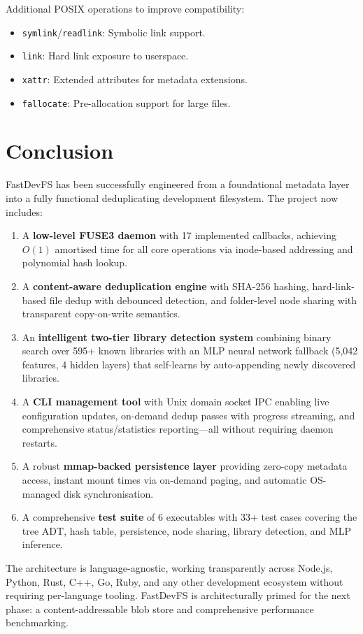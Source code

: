 \documentclass[12pt, a4paper]{article}
\begin{document}
Additional POSIX operations to improve compatibility:
\begin{itemize}
  \item \texttt{symlink}/\texttt{readlink}: Symbolic link support.
  \item \texttt{link}: Hard link exposure to userspace.
  \item \texttt{xattr}: Extended attributes for metadata extensions.
  \item \texttt{fallocate}: Pre-allocation support for large files.
\end{itemize}

\section{Conclusion}

FastDevFS has been successfully engineered from a foundational metadata layer into a fully functional deduplicating development filesystem. The project now includes:

\begin{enumerate}
  \item A \textbf{low-level FUSE3 daemon} with 17 implemented callbacks, achieving $O(1)$ amortised time for all core operations via inode-based addressing and polynomial hash lookup.

  \item A \textbf{content-aware deduplication engine} with SHA-256 hashing, hard-link-based file dedup with debounced detection, and folder-level node sharing with transparent copy-on-write semantics.

  \item An \textbf{intelligent two-tier library detection system} combining binary search over 595+ known libraries with an MLP neural network fallback (5,042 features, 4 hidden layers) that self-learns by auto-appending newly discovered libraries.

  \item A \textbf{CLI management tool} with Unix domain socket IPC enabling live configuration updates, on-demand dedup passes with progress streaming, and comprehensive status/statistics reporting---all without requiring daemon restarts.

  \item A robust \textbf{mmap-backed persistence layer} providing zero-copy metadata access, instant mount times via on-demand paging, and automatic OS-managed disk synchronisation.

  \item A comprehensive \textbf{test suite} of 6 executables with 33+ test cases covering the tree ADT, hash table, persistence, node sharing, library detection, and MLP inference.
\end{enumerate}

The architecture is language-agnostic, working transparently across Node.js, Python, Rust, C++, Go, Ruby, and any other development ecosystem without requiring per-language tooling. FastDevFS is architecturally primed for the next phase: a content-addressable blob store and comprehensive performance benchmarking.
\end{document}
